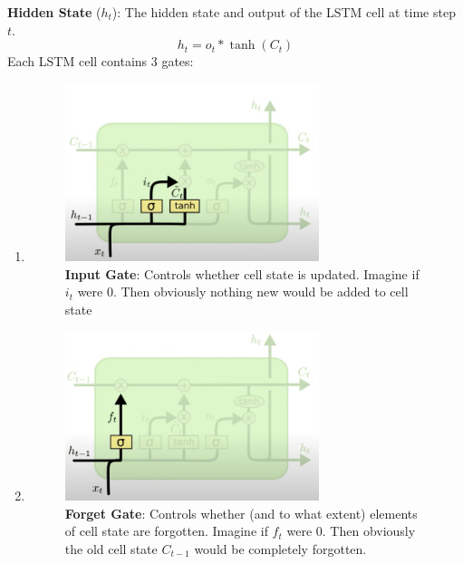 \documentclass[12pt]{article}
\begin{document}
\textbf{Hidden State} (\(h_t\)): The hidden state and output of the LSTM cell at time step \(t\).
\begin{equation}
    h_t = o_t \ast \tanh(C_t)
\end{equation}
 Each LSTM cell contains 3 gates: 
\begin{enumerate}
	\item \begin{figure}[H] \centering \includegraphics[width=0.7\textwidth]{./lstm_input_gate.png} \caption{\textbf{Input Gate}: Controls whether cell state is updated. Imagine if \(i_t\) were 0. Then obviously nothing new would be added to cell state} \end{figure}
	\item  \begin{figure}[H] \centering \includegraphics[width=0.7\textwidth]{./lstm_forget_gate.png} \caption{\textbf{Forget Gate}: Controls whether (and to what extent) elements of cell state are forgotten. Imagine if \(f_t\) were 0. Then obviously the old cell state \(C_{t-1}\) would be completely forgotten.} \end{figure}

\end{enumerate}
\end{document}
